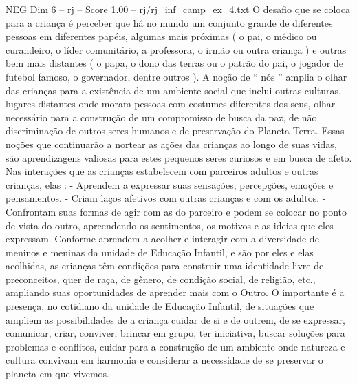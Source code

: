 \begin{textsample}{NEG Dim 6 – rj – Score 1.00 – rj/rj\_inf\_camp\_ex\_4.txt}
O desafio que se coloca para a criança é perceber que há no mundo um conjunto grande de diferentes pessoas em diferentes papéis, algumas mais próximas ( o pai, o médico ou curandeiro, o líder comunitário, a professora, o irmão ou outra criança ) e outras bem mais distantes ( o papa, o dono das terras ou o patrão do pai, o jogador de futebol famoso, o governador, dentre outros ).
A noção de “ nós ” amplia o olhar das crianças para a existência de um ambiente social que inclui outras culturas, lugares distantes onde moram pessoas com costumes diferentes dos seus, olhar necessário para a construção de um compromisso de busca da paz, de não discriminação de outros seres humanos e de preservação do Planeta Terra.
Essas noções que continuarão a nortear as ações das crianças ao longo de suas vidas, são aprendizagens valiosas para estes pequenos seres curiosos e em busca de afeto.
Nas interações que as crianças estabelecem com parceiros adultos e outras crianças, elas : - Aprendem a expressar suas sensações, percepções, emoções e pensamentos. - Criam laços afetivos com outras crianças e com os adultos. - Confrontam suas formas de agir com as do parceiro e podem se colocar no ponto de vista do outro, apreendendo os sentimentos, os motivos e as ideias que eles expressam.
Conforme aprendem a acolher e interagir com a diversidade de meninos e meninas da unidade de Educação Infantil, e são por eles e elas acolhidas, as crianças têm condições para construir uma identidade livre de preconceitos, quer de raça, de gênero, de condição social, de religião, etc., ampliando suas oportunidades de aprender mais com o Outro.
O importante é a presença, no cotidiano da unidade de Educação Infantil, de situações que ampliem as possibilidades de a criança cuidar de si e de outrem, de se expressar, comunicar, criar, conviver, brincar em grupo, ter iniciativa, buscar soluções para problemas e conflitos, cuidar para a construção de um ambiente onde natureza e cultura convivam em harmonia e considerar a necessidade de se preservar o planeta em que vivemos.

\end{textsample}
